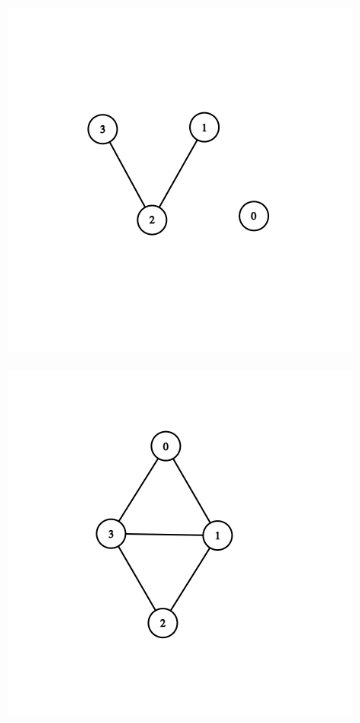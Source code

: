\documentclass[12pt, a4paper, hidelinks]{article}
\begin{document}
\begin{figure}[H]
    \centering
    \begin{subfigure}[b]{0.45\textwidth}
        \includegraphics[width=\textwidth]{graph_v4_3.png}
    \end{subfigure}
    \begin{subfigure}[b]{0.45\textwidth}
        \includegraphics[width=\textwidth]{graph_v4_4.png}
    \end{subfigure}
\end{figure}
\end{document}
